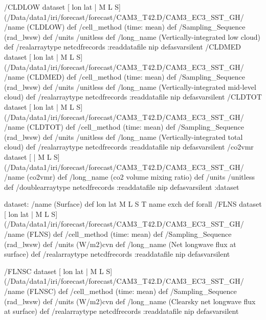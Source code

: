 \begin{ingrid}
 /CLDLOW{
dataset
[ lon lat | M L S] (/Data/data1/iri/forecast/forecast/CAM3_T42.D/CAM3_EC3_SST_GH/%
/name (CLDLOW) def
 /cell_method (time: mean) def
 /Sampling_Sequence (rad_lwsw) def
 /units /unitless def
 /long_name (Vertically-integrated low cloud) def
 /realarraytype netcdfrecords :readdatafile
nip
}defasvarsilent
 /CLDMED{
dataset
[ lon lat | M L S] (/Data/data1/iri/forecast/forecast/CAM3_T42.D/CAM3_EC3_SST_GH/%
/name (CLDMED) def
 /cell_method (time: mean) def
 /Sampling_Sequence (rad_lwsw) def
 /units /unitless def
 /long_name (Vertically-integrated mid-level cloud) def
 /realarraytype netcdfrecords :readdatafile
nip
}defasvarsilent
 /CLDTOT{
dataset
[ lon lat | M L S] (/Data/data1/iri/forecast/forecast/CAM3_T42.D/CAM3_EC3_SST_GH/%
/name (CLDTOT) def
 /cell_method (time: mean) def
 /Sampling_Sequence (rad_lwsw) def
 /units /unitless def
 /long_name (Vertically-integrated total cloud) def
 /realarraytype netcdfrecords :readdatafile
nip
}defasvarsilent
 /co2vmr{
dataset
[ | M L S] (/Data/data1/iri/forecast/forecast/CAM3_T42.D/CAM3_EC3_SST_GH/%
/name (co2vmr) def
 /long_name (co2 volume mixing ratio) def
 /units /unitless def
 /doublearraytype netcdfrecords :readdatafile
nip
}defasvarsilent
:dataset 


dataset:
/name (Surface) def
{ lon lat M L S T } {name exch def} forall
 /FLNS{
dataset
[ lon lat | M L S] (/Data/data1/iri/forecast/forecast/CAM3_T42.D/CAM3_EC3_SST_GH/%
/name (FLNS) def
 /cell_method (time: mean) def
 /Sampling_Sequence (rad_lwsw) def
 /units (W/m2)cvn def
 /long_name (Net longwave flux at surface) def
 /realarraytype netcdfrecords :readdatafile
nip
}defasvarsilent

 /FLNSC{
dataset
[ lon lat | M L S] (/Data/data1/iri/forecast/forecast/CAM3_T42.D/CAM3_EC3_SST_GH/%
/name (FLNSC) def
 /cell_method (time: mean) def
 /Sampling_Sequence (rad_lwsw) def
 /units (W/m2)cvn def
 /long_name (Clearsky net longwave flux at surface) def
 /realarraytype netcdfrecords :readdatafile
nip
}defasvarsilent


\end{ingrid}
